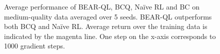 \begin{figure}[t!]
\begin{subfigure}[t]{0.23\textwidth}
    \end{subfigure}
    \caption{ \footnotesize Average performance of BEAR-QL, BCQ, Na\"ive RL and BC on medium-quality data averaged over 5 seeds. BEAR-QL outperforms both BCQ and Na\"ive RL. Average return over the training data is indicated by the magenta line. One step on the x-axis corresponds to 1000 gradient steps.}
    \label{fig:mediocre}
    \vspace{-0.1in}
\end{figure}


\vspace{-5pt}
